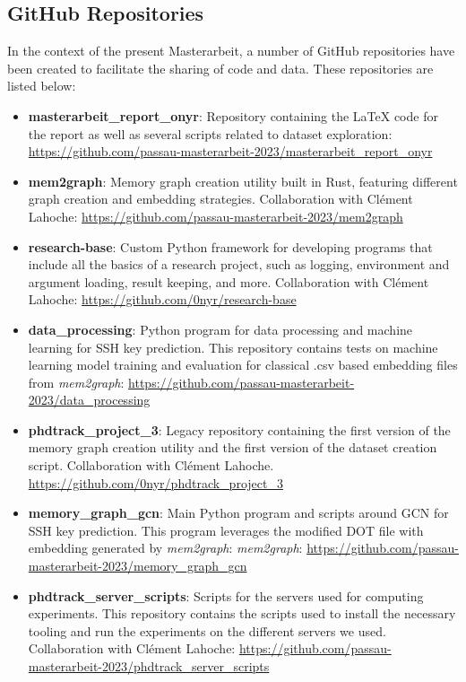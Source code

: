 	\subsection{GitHub Repositories}

	In the context of the present Masterarbeit, a number of GitHub repositories have been created to facilitate the sharing of code and data. These repositories are listed below:

	\begin{itemize}

		\item \textbf{masterarbeit\_report\_onyr}: Repository containing the LaTeX code for the report as well as several scripts related to dataset exploration: \url{https://github.com/passau-masterarbeit-2023/masterarbeit_report_onyr}
		
		\item \textbf{mem2graph}: Memory graph creation utility built in Rust, featuring different graph creation and embedding strategies. Collaboration with Clément Lahoche: \url{https://github.com/passau-masterarbeit-2023/mem2graph}

		\item \textbf{research-base}: Custom Python framework for developing programs that include all the basics of a research project, such as logging, environment and argument loading, result keeping, and more. Collaboration with Clément Lahoche: \url{https://github.com/0nyr/research-base}

		\item \textbf{data\_processing}: Python program for data processing and machine learning for SSH key prediction. This repository contains tests on machine learning model training and evaluation for classical .csv based embedding files from \textit{mem2graph}: \url{https://github.com/passau-masterarbeit-2023/data_processing}
		
		\item \textbf{phdtrack\_project\_3}: Legacy repository containing the first version of the memory graph creation utility and the first version of the dataset creation script. Collaboration with Clément Lahoche. \url{https://github.com/0nyr/phdtrack_project_3}
		
		\item \textbf{memory\_graph\_gcn}: Main Python program and scripts around GCN for SSH key prediction. This program leverages the modified DOT file with embedding generated by \textit{mem2graph}: \textit{mem2graph}:
		\url{https://github.com/passau-masterarbeit-2023/memory_graph_gcn}

		\item \textbf{phdtrack\_server\_scripts}: Scripts for the servers used for computing experiments. This repository contains the scripts used to install the necessary tooling and run the experiments on the different servers we used. Collaboration with Clément Lahoche:
		\url{https://github.com/passau-masterarbeit-2023/phdtrack_server_scripts}
	\end{itemize}

